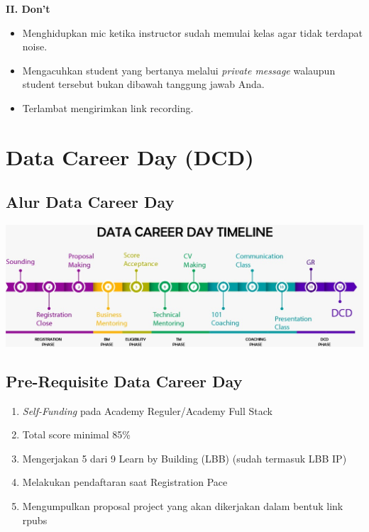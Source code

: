 \documentclass[
]{book}
\providecommand{\tightlist}{%
  \setlength{\itemsep}{0pt}\setlength{\parskip}{0pt}}
\begin{document}
\textbf{II. Don't}

\begin{itemize}
\tightlist
\item
  Menghidupkan mic ketika instructor sudah memulai kelas agar tidak terdapat noise.
\item
  Mengacuhkan student yang bertanya melalui \emph{private message} walaupun student tersebut bukan dibawah tanggung jawab Anda.
\item
  Terlambat mengirimkan link recording.
\end{itemize}

\hypertarget{data-career-day-dcd}{%
\chapter{Data Career Day (DCD)}\label{data-career-day-dcd}}

\hypertarget{alur-data-career-day}{%
\section{Alur Data Career Day}\label{alur-data-career-day}}

\includegraphics{assets/DCD pace.jpeg}

\hypertarget{pre-requisite-data-career-day}{%
\section{Pre-Requisite Data Career Day}\label{pre-requisite-data-career-day}}

\begin{enumerate}
\def\labelenumi{\arabic{enumi}.}
\tightlist
\item
  \emph{Self-Funding} pada Academy Reguler/Academy Full Stack
\item
  Total score minimal 85\%
\item
  Mengerjakan 5 dari 9 Learn by Building (LBB) (sudah termasuk LBB IP)
\item
  Melakukan pendaftaran saat Registration Pace
\item
  Mengumpulkan proposal project yang akan dikerjakan dalam bentuk link rpubs
\end{enumerate}
\end{document}
